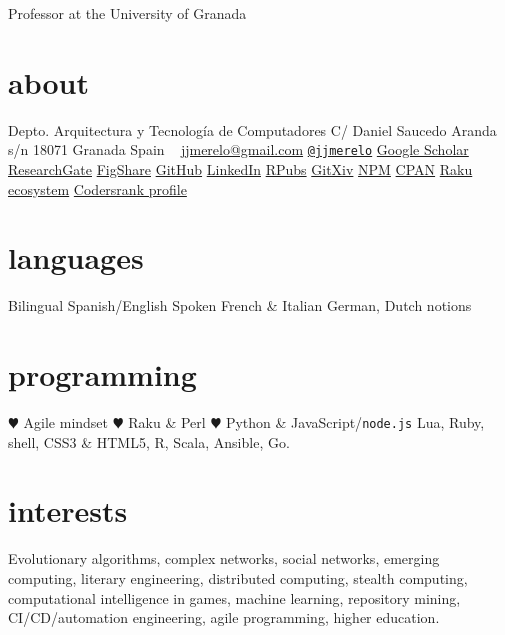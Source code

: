 \documentclass[]{friggeri-jj-cv}
\begin{document}
       {Professor at the University of Granada}

\begin{aside}
  \section{about}
    Depto. Arquitectura y Tecnología de Computadores
    C/ Daniel Saucedo Aranda s/n
    18071 Granada
    Spain
    ~
    \href{mailto:jjmerelo@gmail.com}{jjmerelo@gmail.com}
    \href{http://twitter.com/jjmerelo}{{\tt @jjmerelo}}
    \href{http://scholar.google.com/citations?user=gFxqc64AAAAJ}{Google Scholar}
    \href{https://www.researchgate.net/profile/JJ_Merelo}{ResearchGate}
    \href{https://figshare.com/authors/Juan_J_Merelo/541327}{FigShare}
   \href{https://github.com/JJ}{GitHub}
   \href{http://lnkd.in/dBVqYPa}{LinkedIn}
   \href{http://rpubs.com/jjmerelo/}{RPubs}
   \href{http://gitxiv.com/users/jj-merelo}{GitXiv}
   \href{https://www.npmjs.com/~jjmerelo}{NPM}
   \href{http://search.cpan.org/~jmerelo/}{CPAN}
   \href{https://modules.raku.org/search/?q=author%3A%22JMERELO%22}{Raku ecosystem}
   \href{https://profile.codersrank.io/user/jj}{Codersrank profile}
  \section{languages}
    Bilingual Spanish/English
    Spoken French \& Italian
    German, Dutch notions
  \section{programming}
  {\color{red} \large $\varheartsuit$} Agile mindset
  {\color{red} \large $\varheartsuit$} Raku \& Perl
  {\color{red} $\varheartsuit$} Python \& JavaScript/{\tt node.js}
    Lua, Ruby, shell, CSS3 \& HTML5, R, Scala, Ansible, Go.
  \end{aside}

\section{interests}

Evolutionary algorithms, complex networks, social networks, emerging
computing, literary engineering, distributed computing, stealth
computing, computational intelligence in games, machine learning,
repository mining, CI/CD/automation engineering, agile programming,
higher education.
\end{document}
